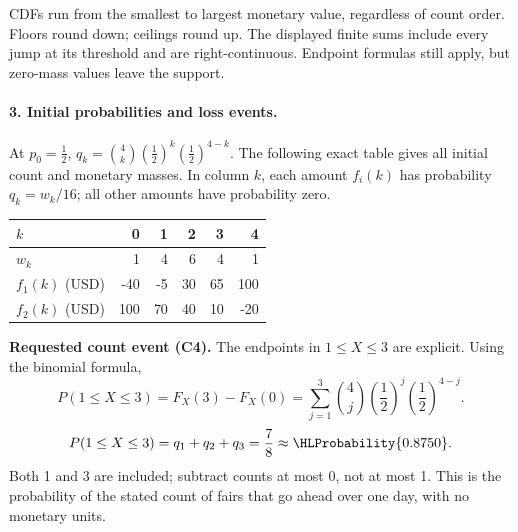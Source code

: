 CDFs run from the smallest to largest monetary value, regardless of count order. Floors round down; ceilings round up. The displayed finite sums include every jump at its threshold and are right-continuous. Endpoint formulas still apply, but zero-mass values leave the support.
\clearpage\paragraph{3. Initial probabilities and loss events.}
At $p_0=\frac{1}{2}$, $q_k=\binom{4}k(\frac{1}{2})^k(\frac{1}{2})^{4-k}$. The following exact table gives all initial count and monetary masses. In column $k$, each amount $f_i(k)$ has probability $q_k=w_k/16$; all other amounts have probability zero.
\begin{center}\begin{tabular}{lrrrrr}\toprule
$k$ & 0 & 1 & 2 & 3 & 4\\\midrule
$w_k$ & 1 & 4 & 6 & 4 & 1\\
$f_1(k)$ (USD) & -40 & -5 & 30 & 65 & 100\\
$f_2(k)$ (USD) & 100 & 70 & 40 & 10 & -20\\
\bottomrule\end{tabular}\end{center}
\textbf{Requested count event (C4).} The endpoints in $1\leq X\leq 3$ are explicit. Using the binomial formula,
\[P(1\leq X\leq 3)=F_X(3)-F_X(0)=\sum_{j=1}^{3}\binom{4}j(\frac{1}{2})^j(\frac{1}{2})^{4-j}.\]
\[P(1\leq X\leq 3)=q_{1}+q_{2}+q_{3}=\frac{7}{8}\approx\HLProbability{0.8750}.\]
Both 1 and 3 are included; subtract counts at most 0, not at most 1.
This is the probability of the stated count of fairs that go ahead over one day, with no monetary units.
\clearpage
